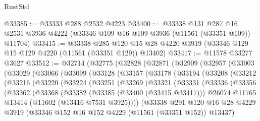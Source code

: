 \begin{lexlean}{RustStd}
\begin{coremodule}
@33385 := @33333 @288 @2532 @4223
@33400 := @33338
    @131
    @287
    @16
    @2531
    @3936
    @4222
    (@33346 @109 @16 @109 @3936 (@11561 (@33351 @109)) @11704)
@33415 := @33338
    @285
    @120
    @15
    @28
    @4220
    @3919
    (@33346 @129 @15 @129 @4220 (@11561 (@33351 @129)) @13402)
@33417 := @11578 @33277 @3627
@33512 := @32714
    (@32775
      (@32828
        (@32871
          (@32909
            (@32957
              (@33003
                (@33029
                  (@33066
                    (@33099
                      (@33128
                        (@33157
                          (@33178
                            (@33194
                              (@33208
                                (@33212
                                  (@33216
                                    (@33220
                                      (@33224
                                        (@33251
                                          (@33269
                                            (@33321
                                              (@33331
                                                (@33336
                                                  (@33356
                                                    (@33362
                                                      (@33368
                                                        (@33382
                                                          (@33385 (@33400 (@33415 @33417)))
                                                          @26074
                                                          @11765
                                                          @13414
                                                          (@11602 (@13416 @7531 @3925))))
                                                      (@33338
                                                        @291
                                                        @120
                                                        @16
                                                        @28
                                                        @4229
                                                        @3919
                                                        (@33346
                                                          @152
                                                          @16
                                                          @152
                                                          @4229
                                                          (@11561 (@33351 @152))
                                                          @13437)

\end{coremodule}
\end{lexlean}
